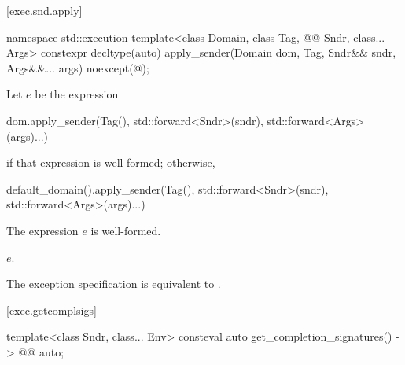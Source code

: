 [exec.snd.apply]{}

%
\begin{itemdecl}
namespace std::execution {
  template<class Domain, class Tag, @@ Sndr, class... Args>
    constexpr decltype(auto) apply_sender(Domain dom, Tag, Sndr&& sndr, Args&&... args)
      noexcept(@\seebelow@);
}
\end{itemdecl}

\begin{itemdescr}
\pnum
Let $e$ be the expression
\begin{codeblock}
dom.apply_sender(Tag(), std::forward<Sndr>(sndr), std::forward<Args>(args)...)
\end{codeblock}
if that expression is well-formed; otherwise,
\begin{codeblock}
default_domain().apply_sender(Tag(), std::forward<Sndr>(sndr), std::forward<Args>(args)...)
\end{codeblock}

\pnum
\constraints
The expression $e$ is well-formed.

\pnum
\returns
$e$.

\pnum
\remarks
The exception specification is equivalent to .
\end{itemdescr}

[exec.getcomplsigs]{}

%
\begin{itemdecl}
template<class Sndr, class... Env>
  consteval auto get_completion_signatures() -> @@ auto;
\end{itemdecl}


